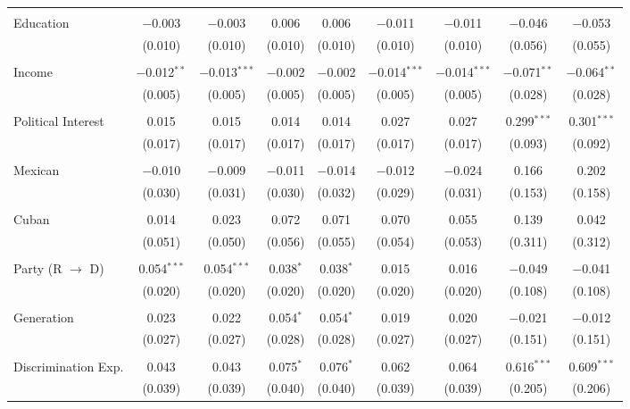 \begin{table}[!htbp]
\begin{tabular}{@{\extracolsep{5pt}}lcccccccc}
  & & & & & & & & \\ 
 Education & $-$0.003 & $-$0.003 & 0.006 & 0.006 & $-$0.011 & $-$0.011 & $-$0.046 & $-$0.053 \\ 
  & (0.010) & (0.010) & (0.010) & (0.010) & (0.010) & (0.010) & (0.056) & (0.055) \\ 
  & & & & & & & & \\ 
 Income & $-$0.012$^{**}$ & $-$0.013$^{***}$ & $-$0.002 & $-$0.002 & $-$0.014$^{***}$ & $-$0.014$^{***}$ & $-$0.071$^{**}$ & $-$0.064$^{**}$ \\ 
  & (0.005) & (0.005) & (0.005) & (0.005) & (0.005) & (0.005) & (0.028) & (0.028) \\ 
  & & & & & & & & \\ 
 Political Interest & 0.015 & 0.015 & 0.014 & 0.014 & 0.027 & 0.027 & 0.299$^{***}$ & 0.301$^{***}$ \\ 
  & (0.017) & (0.017) & (0.017) & (0.017) & (0.017) & (0.017) & (0.093) & (0.092) \\ 
  & & & & & & & & \\ 
 Mexican & $-$0.010 & $-$0.009 & $-$0.011 & $-$0.014 & $-$0.012 & $-$0.024 & 0.166 & 0.202 \\ 
  & (0.030) & (0.031) & (0.030) & (0.032) & (0.029) & (0.031) & (0.153) & (0.158) \\ 
  & & & & & & & & \\ 
 Cuban & 0.014 & 0.023 & 0.072 & 0.071 & 0.070 & 0.055 & 0.139 & 0.042 \\ 
  & (0.051) & (0.050) & (0.056) & (0.055) & (0.054) & (0.053) & (0.311) & (0.312) \\ 
  & & & & & & & & \\ 
 Party (R $\longrightarrow$ D) & 0.054$^{***}$ & 0.054$^{***}$ & 0.038$^{*}$ & 0.038$^{*}$ & 0.015 & 0.016 & $-$0.049 & $-$0.041 \\ 
  & (0.020) & (0.020) & (0.020) & (0.020) & (0.020) & (0.020) & (0.108) & (0.108) \\ 
  & & & & & & & & \\ 
 Generation & 0.023 & 0.022 & 0.054$^{*}$ & 0.054$^{*}$ & 0.019 & 0.020 & $-$0.021 & $-$0.012 \\ 
  & (0.027) & (0.027) & (0.028) & (0.028) & (0.027) & (0.027) & (0.151) & (0.151) \\ 
  & & & & & & & & \\ 
 Discrimination Exp. & 0.043 & 0.043 & 0.075$^{*}$ & 0.076$^{*}$ & 0.062 & 0.064 & 0.616$^{***}$ & 0.609$^{***}$ \\ 
  & (0.039) & (0.039) & (0.040) & (0.040) & (0.039) & (0.039) & (0.205) & (0.206) \\ 

\end{tabular}
\end{table}
